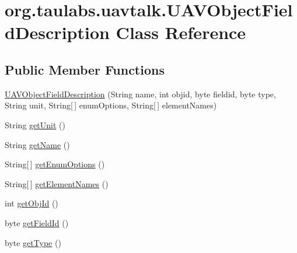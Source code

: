 \hypertarget{classorg_1_1taulabs_1_1uavtalk_1_1_u_a_v_object_field_description}{\section{org.\-taulabs.\-uavtalk.\-U\-A\-V\-Object\-Field\-Description \-Class \-Reference}
\label{classorg_1_1taulabs_1_1uavtalk_1_1_u_a_v_object_field_description}
}
\subsection*{\-Public \-Member \-Functions}
\begin{DoxyCompactItemize}
\item 
\hyperlink{classorg_1_1taulabs_1_1uavtalk_1_1_u_a_v_object_field_description_acd6685415a0bcc795e703f93075ff77e}{\-U\-A\-V\-Object\-Field\-Description} (\-String name, int objid, byte fieldid, byte type, \-String unit, \-String\mbox{[}$\,$\mbox{]} enum\-Options, \-String\mbox{[}$\,$\mbox{]} element\-Names)
\item 
\-String \hyperlink{classorg_1_1taulabs_1_1uavtalk_1_1_u_a_v_object_field_description_ab0a176bfcc40e7641956c39febf2d4a1}{get\-Unit} ()
\item 
\-String \hyperlink{classorg_1_1taulabs_1_1uavtalk_1_1_u_a_v_object_field_description_a6d0350d0647d69ca5ba3ddfa69d4d7c6}{get\-Name} ()
\item 
\-String\mbox{[}$\,$\mbox{]} \hyperlink{classorg_1_1taulabs_1_1uavtalk_1_1_u_a_v_object_field_description_ac99b04f1b64f4483043fd4d0c47787d9}{get\-Enum\-Options} ()
\item 
\-String\mbox{[}$\,$\mbox{]} \hyperlink{classorg_1_1taulabs_1_1uavtalk_1_1_u_a_v_object_field_description_a7e7ce733e940b73c0c0f696f8beefcec}{get\-Element\-Names} ()
\item 
int \hyperlink{classorg_1_1taulabs_1_1uavtalk_1_1_u_a_v_object_field_description_a9122f158740fd7ed7da44cfd39afac7b}{get\-Obj\-Id} ()
\item 
byte \hyperlink{classorg_1_1taulabs_1_1uavtalk_1_1_u_a_v_object_field_description_add33bd1f915250f43fbabd4804a170c5}{get\-Field\-Id} ()
\item 
byte \hyperlink{classorg_1_1taulabs_1_1uavtalk_1_1_u_a_v_object_field_description_ace90d41125acb4cd6cc8f573264ac755}{get\-Type} ()
\end{DoxyCompactItemize}
